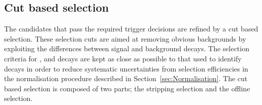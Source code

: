 


\subsection{Cut based selection}
\label{sec:cutbasedsel}
The \bmumu candidates that pass the required trigger decisions are refined by a cut based selection. These selection cuts are aimed at removing obvious backgrounds by exploiting the differences between signal and background decays. %
The selection criteria for \bhh, \bujpsik and \bsjpsiphi decays are kept as close as possible to that used to identify \bmumu decays in order to reduce systematic uncertainties from selection efficiencies in the normalisation procedure described in Section~\ref{sec:Normalisation}. 
The cut based selection is composed of two parts; the stripping selection and the offline selection. 

